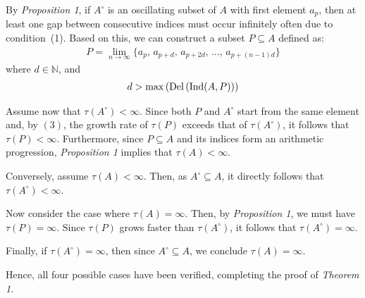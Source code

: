 By \emph{Proposition 1}, if $A^\circ$ is an oscillating subset of $A$ with first element $a_p$, then at least one gap between consecutive indices must occur infinitely often due to condition~(1). Based on this, we can construct a subset $P \subseteq A$ defined as:
\begin{align}
P = \lim_{n \to \infty} \{ a_p,\, a_{p+d},\, a_{p+2d},\, \dots,\, a_{p+(n-1)d} \}
\end{align}
where $d \in \mathbb{N}$, and
\begin{align}
d > \max\left( \operatorname{Del}\left( \operatorname{Ind}(A, P) \right) \right)
\end{align}

Assume now that $\tau(A^\circ) < \infty$. Since both $P$ and $A^\circ$ start from the same element and, by $(3)$, the growth rate of $\tau(P)$ exceeds that of $\tau(A^\circ)$, it follows that $\tau(P) < \infty$. Furthermore, since $P \subseteq A$ and its indices form an arithmetic progression, \emph{Proposition 1} implies that $\tau(A) < \infty$.

Conversely, assume $\tau(A) < \infty$. Then, as $A^\circ \subseteq A$, it directly follows that $\tau(A^\circ) < \infty$.

Now consider the case where $\tau(A) = \infty$. Then, by \emph{Proposition 1}, we must have $\tau(P) = \infty$. Since $\tau(P)$ grows faster than $\tau(A^\circ)$, it follows that $\tau(A^\circ) = \infty$.

Finally, if $\tau(A^\circ) = \infty$, then since $A^\circ \subseteq A$, we conclude $\tau(A) = \infty$.

Hence, all four possible cases have been verified, completing the proof of \emph{Theorem 1}.
